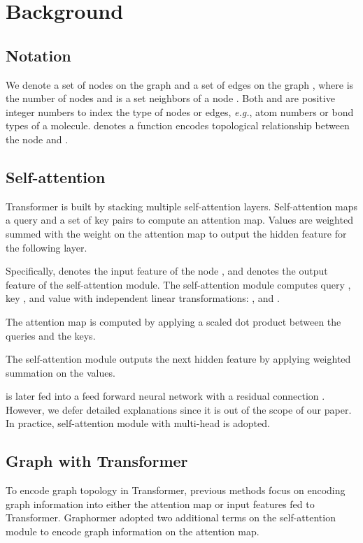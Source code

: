 \documentclass[letterpaper]{article} \usepackage{aaai23}  \usepackage{times}  \usepackage{helvet}  \usepackage{courier}  \usepackage[hyphens]{url}  \usepackage{graphicx} \urlstyle{rm} \def\UrlFont{\rm}  \usepackage{natbib}  \usepackage{caption} \frenchspacing  \setlength{\pdfpagewidth}{8.5in} \setlength{\pdfpageheight}{11in} \usepackage{algorithm}
\newcommand{\eg}{\textit{e.g.}}
\begin{document}
%
 


\section{Background}
\label{sec:background}


\smallbreak
\subsection{Notation}
We denote a set of nodes on the graph   and a set of edges on the graph , where  is the number of nodes and 
 is a set neighbors of a node . 
Both  and  are positive integer numbers to index the type of nodes or edges, \eg, atom numbers or bond types of a molecule.
 denotes a function encodes topological relationship between the node  and . 


\subsection{Self-attention} 
Transformer is built by stacking multiple self-attention layers.
Self-attention maps a query and a set of key pairs to compute an attention map. 
Values are weighted summed with the weight on the attention map to output the hidden feature for the following layer.

Specifically,  denotes the input feature of the node , and  denotes the output feature of the self-attention module.
The self-attention module computes query , key , and value  with independent linear transformations: ,  and .

The attention map is computed by applying a scaled dot product between the queries and the keys.

The self-attention module outputs the next hidden feature by applying weighted summation on the values.

 is later fed into a feed forward neural network with a residual connection \citep{he2016deep}. However, we defer detailed explanations since it is out of the scope of our paper.
In practice, self-attention module with multi-head is adopted.


\subsection{Graph with Transformer}

To encode graph topology in Transformer, previous methods focus on encoding graph information into either the attention map or input features fed to Transformer.
Graphormer \citep{ying2021transformers} adopted two additional terms on the self-attention module to encode graph information on the attention map.
\end{document}

